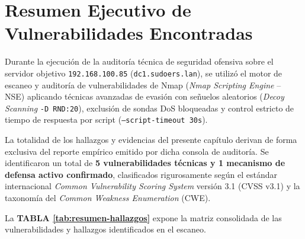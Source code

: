 
\section{Resumen Ejecutivo de Vulnerabilidades Encontradas}

Durante la ejecución de la auditoría técnica de seguridad ofensiva sobre el servidor objetivo \texttt{192.168.100.85} (\texttt{dc1.sudoers.lan}), se utilizó el motor de escaneo y auditoría de vulnerabilidades de Nmap (\textit{Nmap Scripting Engine} -- NSE) aplicando técnicas avanzadas de evasión con señuelos aleatorios (\textit{Decoy Scanning} \texttt{-D RND:20}), exclusión de sondas DoS bloqueadas y control estricto de tiempo de respuesta por script (\texttt{--script-timeout 30s}).

La totalidad de los hallazgos y evidencias del presente capítulo derivan de forma exclusiva del reporte empírico emitido por dicha consola de auditoría. Se identificaron un total de \textbf{5 vulnerabilidades técnicas y 1 mecanismo de defensa activo confirmado}, clasificados rigurosamente según el estándar internacional \textit{Common Vulnerability Scoring System} versión 3.1 (CVSS v3.1) \citep{first_cvss_2019} y la taxonomía del \textit{Common Weakness Enumeration} (CWE).

La \textbf{TABLA \ref{tab:resumen-hallazgos}} expone la matriz consolidada de las vulnerabilidades y hallazgos identificados en el escaneo.

